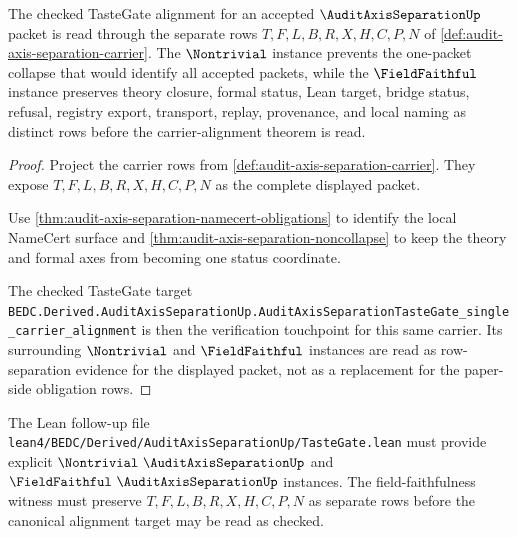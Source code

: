 \begin{theorem}
\label{thm:audit-axis-separation-obligation-scope}
The checked TasteGate alignment for an accepted $\AuditAxisSeparationUp$ packet is read through the separate rows $T,F,L,B,R,X,H,C,P,N$ of \autoref{def:audit-axis-separation-carrier}. The $\Nontrivial$ instance prevents the one-packet collapse that would identify all accepted packets, while the $\FieldFaithful$ instance preserves theory closure, formal status, Lean target, bridge status, refusal, registry export, transport, replay, provenance, and local naming as distinct rows before the carrier-alignment theorem is read.
\end{theorem}
\begin{proof}
Project the carrier rows from \autoref{def:audit-axis-separation-carrier}. They expose $T,F,L,B,R,X,H,C,P,N$ as the complete displayed packet.

Use \autoref{thm:audit-axis-separation-namecert-obligations} to identify the local NameCert surface and \autoref{thm:audit-axis-separation-noncollapse} to keep the theory and formal axes from becoming one status coordinate.

The checked TasteGate target
\texttt{BEDC.Derived.AuditAxisSeparationUp.AuditAxisSeparationTasteGate\_single\_carrier\_alignment}
is then the verification touchpoint for this same carrier. Its surrounding $\Nontrivial$ and $\FieldFaithful$ instances are read as row-separation evidence for the displayed packet, not as a replacement for the paper-side obligation rows.
\end{proof}



The Lean follow-up file \texttt{lean4/BEDC/Derived/AuditAxisSeparationUp/TasteGate.lean} must provide explicit $\Nontrivial\ \AuditAxisSeparationUp$ and $\FieldFaithful\ \AuditAxisSeparationUp$ instances. The field-faithfulness witness must preserve $T,F,L,B,R,X,H,C,P,N$ as separate rows before the canonical alignment target may be read as checked.

